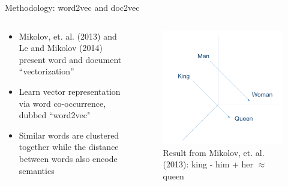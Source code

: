 \documentclass[9pt]{beamer}
\begin{document}
	\begin{frame}{Methodology: word2vec and doc2vec}
		
		\begin{columns}
			\begin{column}{0.5\textwidth}
				\begin{itemize}
					\item Mikolov, et. al. (2013) and Le and Mikolov (2014) present word and document \textquotedblleft vectorization\textquotedblright
					\item Learn vector representation via word co-occurrence, dubbed ``word2vec"
					\item Similar words are clustered together while the distance between words also encode semantics
				\end{itemize}
			\end{column}
			\begin{column}{0.5\textwidth}
				\begin{figure}
					\includegraphics[width=\textwidth]{wordembedding.png}
					\caption{Result from Mikolov, et. al. (2013): king - him + her $\approx$ queen}
				\end{figure}
			\end{column}
		\end{columns}
		
		
	\end{frame}
	
\end{document}
